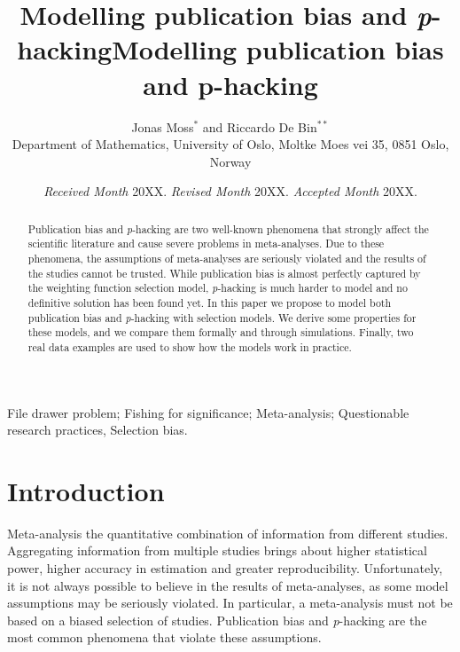 \documentclass[useAMS,usenatbib,referee]{biom}
\title{Modelling publication bias and \textit{p}-hacking}
\author{Jonas Moss$^{*}$\email{jonasmgj@math.uio.no} and
Riccardo De Bin$^{**}$\email{debin@math.uio.no}\\
Department of Mathematics, University of Oslo, Moltke Moes vei 35, 0851 Oslo, Norway}
\title[Modelling publication bias and p-hacking]{Modelling publication bias and p-hacking}
\begin{document}
\date{{\it Received Month} 20XX. {\it Revised Month} 20XX.  {\it Accepted Month} 20XX.}

\pagerange{\pageref{firstpage}--\pageref{lastpage}} 


\label{firstpage}

\begin{abstract}
Publication bias and \textit{p}-hacking are two well-known phenomena that strongly affect the scientific literature and cause severe problems in meta-analyses. Due to these phenomena, the assumptions of meta-analyses are seriously violated and the results of the studies cannot be trusted. While publication bias is almost perfectly captured by the weighting function selection model, \textit{p}-hacking is much harder to model and no definitive solution has been found yet. In this paper we propose to model both publication bias and \textit{p}-hacking with selection models. We derive some properties for these models, and we compare them formally and through simulations. Finally, two real data examples are used to show how the models work in practice.
\end{abstract}

\begin{keywords}
File drawer problem; Fishing for significance; Meta-analysis; Questionable research practices, Selection bias.
\end{keywords}

\maketitle

\section{Introduction}

Meta-analysis the quantitative combination of information from different studies. Aggregating information from multiple studies brings about higher statistical power, higher accuracy in estimation and greater reproducibility. Unfortunately, it is not always possible to believe in the results of meta-analyses, as some model assumptions may be seriously violated. In particular, a meta-analysis must not be based on a biased selection of studies. Publication bias \citep{sterling1959publication} and \textit{p}-hacking \citep{simmons2011false} are the most common phenomena that violate these assumptions. 
\end{document}
